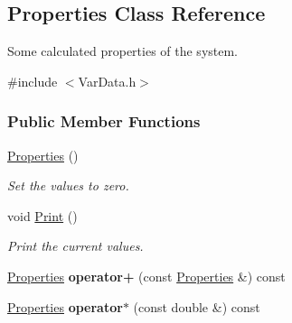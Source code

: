 \hypertarget{classProperties}{}\subsection{Properties Class Reference}
\label{classProperties}


Some calculated properties of the system.  




{\ttfamily \#include $<$Var\+Data.\+h$>$}

\subsubsection*{Public Member Functions}
\begin{DoxyCompactItemize}
\item 
\hyperlink{classProperties_aa7321215b53f90ec4dc293e06ff79938}{Properties} ()\hypertarget{classProperties_aa7321215b53f90ec4dc293e06ff79938}{}\label{classProperties_aa7321215b53f90ec4dc293e06ff79938}

\begin{DoxyCompactList}\small\item\em Set the values to zero. \end{DoxyCompactList}\item 
void \hyperlink{classProperties_a9dcac18006ce057b8d78c847174c1362}{Print} ()\hypertarget{classProperties_a9dcac18006ce057b8d78c847174c1362}{}\label{classProperties_a9dcac18006ce057b8d78c847174c1362}

\begin{DoxyCompactList}\small\item\em Print the current values. \end{DoxyCompactList}\item 
\hyperlink{classProperties}{Properties} {\bfseries operator+} (const \hyperlink{classProperties}{Properties} \&) const \hypertarget{classProperties_a3461e5fc61bb0eb33b089e2c696d2692}{}\label{classProperties_a3461e5fc61bb0eb33b089e2c696d2692}

\item 
\hyperlink{classProperties}{Properties} {\bfseries operator$\ast$} (const double \&) const \hypertarget{classProperties_afa73aff41e3679c9dfc3ba858a1450ff}{}\label{classProperties_afa73aff41e3679c9dfc3ba858a1450ff}

\end{DoxyCompactItemize}

